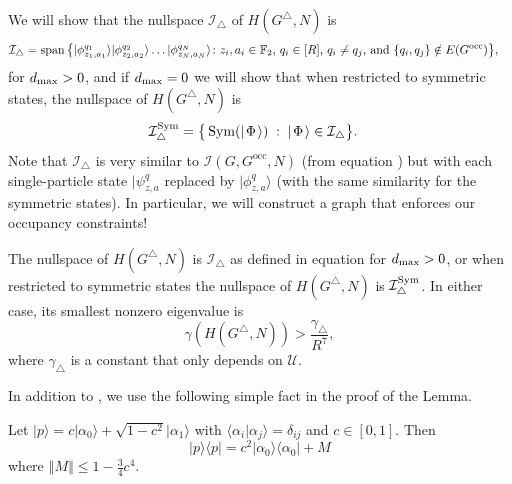 \documentclass[../thesis-main/thesis-main]{subfiles}
\begin{document}
We will show that the nullspace $\mathcal{I}_{\triangle}$ of $H(G^{\triangle},N)$ is 
\begin{align}
  \mathcal{I}_{\triangle}&=\operatorname{span}\big\{|\phi_{z_{1},a_{1}}^{q_{1}}\rangle|\phi_{z_{2},a_{2}}^{q_{2}}\rangle\ldots|\phi_{z_{N},a_{N}}^{q_{N}}\rangle\colon
\text{$z_{i},a_{i}\in\mathbb{F}_2$, $q_{i}\in[R]$, $q_{i}\neq q_{j}$, and $\{q_{i},q_{j}\}\notin E(G^{\text{occ}})$}\big\},
\label{eq:I_triangle}
\end{align}
for $d_{\text{max}} > 0$, and if $d_{\text{max}} = 0$ we will show that when restricted to symmetric states, the nullspace of $H(G^{\triangle},N)$ is 
\begin{align}
  \mathcal{I}_{\triangle}^{\operatorname{Sym}} &=  \big\{ \operatorname{Sym} ( |\mspace{2mu} \Phi \mspace{2mu} \rangle) \; : \; |\mspace{2mu} \Phi \mspace{2mu} \rangle \in \mathcal{I}_{\triangle}\big\}.
\end{align}
Note that $\mathcal{I}_{\triangle}$ is very similar to $\mathcal{I}(G,G^{\text{occ}},N)$ (from equation ) but with each single-particle state $|\psi_{z,a}^{q}$ replaced by $|\phi_{z,a}^{q}\rangle$ (with the same similarity for the symmetric states).  In particular, we will construct a graph that enforces our occupancy constraints!

\begin{lemma}
\label{lem:The-nullspace-of_H_triangle}The nullspace of $H(G^{\triangle},N)$ is $\mathcal{I}_{\triangle}$ as defined in equation  for $d_{\text{max}} >0$, or when restricted to symmetric states the nullspace of $H(G^\triangle,N)$ is $\mathcal{I}_\triangle^{\operatorname{Sym}}$. In either case, its smallest nonzero eigenvalue is 
\begin{equation}
\gamma(H(G^{\triangle},N)) > \frac{\gamma_{\triangle}}{R^{7}},\label{eq:lowerbound_HG_triangle}
\end{equation}
where $\gamma_{\triangle}$ is a constant that only depends on $\mathcal{U}$.
\end{lemma}

In addition to , we use the following simple fact in the proof of the Lemma.

\begin{fact}
\label{fct:lin_alg_fact}
Let $|p\rangle=c|\alpha_{0}\rangle+\sqrt{1-c^{2}}|\alpha_{1}\rangle$ with $\langle\alpha_{i}|\alpha_{j}\rangle=\delta_{ij}$ and $c\in[0,1]$. Then
\begin{equation}
|p\rangle\langle p|=c^{2}|\alpha_{0}\rangle\langle\alpha_{0}|+M
\end{equation}
where $\left\Vert M\right\Vert \leq1-\frac{3}{4}c^{4}$.
\end{fact}
\end{document}
